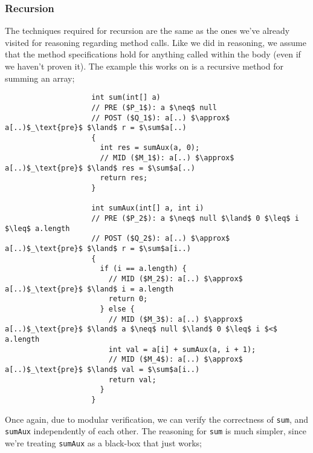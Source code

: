 \documentclass[a4paper, 12pt]{article}
\begin{document}
            \subsubsection*{Recursion}
                The techniques required for recursion are the same as the ones we've already visited for reasoning regarding method calls. Like we did in reasoning, we assume that the method specifications hold for anything called within the body (even if we haven't proven it). The example this works on is a recursive method for summing an array;
                \begin{lstlisting}
                    int sum(int[] a)
                    // PRE ($P_1$): a $\neq$ null
                    // POST ($Q_1$): a[..) $\approx$ a[..)$_\text{pre}$ $\land$ r = $\sum$a[..)
                    {
                      int res = sumAux(a, 0);
                      // MID ($M_1$): a[..) $\approx$ a[..)$_\text{pre}$ $\land$ res = $\sum$a[..)
                      return res;
                    }

                    int sumAux(int[] a, int i)
                    // PRE ($P_2$): a $\neq$ null $\land$ 0 $\leq$ i $\leq$ a.length
                    // POST ($Q_2$): a[..) $\approx$ a[..)$_\text{pre}$ $\land$ r = $\sum$a[i..)
                    {
                      if (i == a.length) {
                        // MID ($M_2$): a[..) $\approx$ a[..)$_\text{pre}$ $\land$ i = a.length
                        return 0;
                      } else {
                        // MID ($M_3$): a[..) $\approx$ a[..)$_\text{pre}$ $\land$ a $\neq$ null $\land$ 0 $\leq$ i $<$ a.length
                        int val = a[i] + sumAux(a, i + 1);
                        // MID ($M_4$): a[..) $\approx$ a[..)$_\text{pre}$ $\land$ val = $\sum$a[i..)
                        return val;
                      }
                    }
                \end{lstlisting}
                Once again, due to modular verification, we can verify the correctness of \texttt{sum}, and \texttt{sumAux} independently of each other. The reasoning for \texttt{sum} is much simpler, since we're treating \texttt{sumAux} as a black-box that just works;
\end{document}
